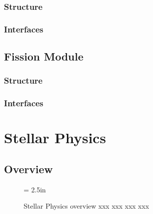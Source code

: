 \documentclass{article}[12pt]
\def\filler{xxxx xxxx xxxx xxxx xxxx xxxx xxxx xxxx xxxx xxxx xxxx xxxx
xxxx xxxx xxxx xxxx xxxx xxxx xxxx xxxx xxxx xxxx xxxx xxxx
xxxx xxxx xxxx xxxx xxxx xxxx xxxx xxxx xxxx xxxx xxxx xxxx
xxxx xxxx xxxx xxxx xxxx xxxx xxxx xxxx xxxx xxxx xxxx xxxx
xxxx xxxx xxxx xxxx xxxx xxxx xxxx xxxx xxxx xxxx xxxx xxxx
xxxx xxxx xxxx xxxx xxxx xxxx xxxx xxxx xxxx xxxx xxxx xxxx
xxxx xxxx xxxx xxxx xxxx xxxx xxxx xxxx xxxx xxxx xxxx xxxx
xxxx xxxx xxxx xxxx xxxx xxxx xxxx xxxx xxxx xxxx xxxx xxxx}
\def\filler{}
\begin{document}
\filler

\subsubsection{Structure}

\filler

\subsubsection{Interfaces}

\filler


\filler


\filler

\subsection{Fission Module}

\filler

\subsubsection{Structure}

\filler

\subsubsection{Interfaces}

\filler


\filler


\filler

\clearpage
\newpage

\section{Stellar Physics}

\filler

\subsection{Overview}

\begin{figure}[htb]
\begin{center}
\epsfxsize = 2.5in
\caption
{Stellar Physics overview xxx xxx xxx xxx}
\label{fig:sp1}
\end{center}
\end{figure}
\end{document}
